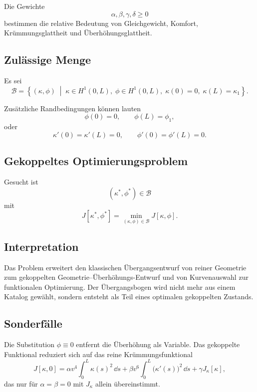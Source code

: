 Die Gewichte
\[
\alpha,\beta,\gamma,\delta\geq0
\]
bestimmen die relative Bedeutung von Gleichgewicht, Komfort,
Krümmungsglattheit und Überhöhungsglattheit.

\subsection{Zulässige Menge}
\begin{definition}
Es sei
\[
\mathcal B=
\left\{(\kappa,\phi)\;\middle|\;
\kappa\in H^1(0,L),\;\phi\in H^1(0,L),\;
\kappa(0)=0,\;\kappa(L)=\kappa_1\right\}.
\]
\end{definition}

Zusätzliche Randbedingungen können lauten
\[
\phi(0)=0,\qquad\phi(L)=\phi_1,
\]
oder
\[
\kappa'(0)=\kappa'(L)=0,
\qquad\phi'(0)=\phi'(L)=0.
\]

\subsection{Gekoppeltes Optimierungsproblem}
\begin{definition}
Gesucht ist
\[
(\kappa^\ast,\phi^\ast)\in\mathcal B
\]
mit
\[
J[\kappa^\ast,\phi^\ast]
=\min_{(\kappa,\phi)\in\mathcal B}J[\kappa,\phi].
\]
\end{definition}

\subsection{Interpretation}
Das Problem erweitert den klassischen Übergangsentwurf von reiner Geometrie
zum gekoppelten Geometrie--Überhöhungs-Entwurf und von Kurvenauswahl zur
funktionalen Optimierung. Der Übergangsbogen wird nicht mehr aus einem Katalog
gewählt, sondern entsteht als Teil eines optimalen gekoppelten Zustands.

\subsection{Sonderfälle}
\begin{corollary}
\label{cor:coupled-substitution-phi-zero}
Die Substitution \(\phi\equiv0\) entfernt die Überhöhung als Variable. Das
gekoppelte Funktional reduziert sich auf das reine Krümmungsfunktional
\[
J[\kappa,0]
=\alpha v^4\int_0^L\kappa(s)^2\,\dd s
+\beta v^6\int_0^L\bigl(\kappa'(s)\bigr)^2\,\dd s
+\gamma J_\kappa[\kappa],
\]
das nur für \(\alpha=\beta=0\) mit \(J_\kappa\) allein übereinstimmt.
\end{corollary}

